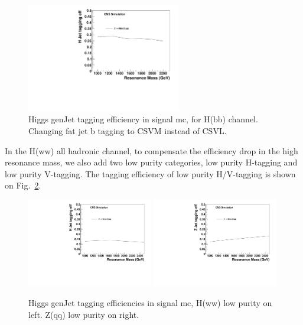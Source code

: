 \begin{figure}[htb]
\begin{center}
\includegraphics[width=0.60\textwidth]{HbbZqqfigs/Signal/H-taggingEff-8TeV-CSVM.pdf}
\end{center}
\caption{
Higgs genJet tagging efficiency in signal mc, for H(bb) channel.  Changing fat jet b tagging to CSVM instead of CSVL. 
}
\label{fig:fatCSVM}
\end{figure}


In the H(ww) all hadronic channel, to compensate the efficiency drop in the high resonance mass, we also add two low purity 
categories, low purity H-tagging and low purity V-tagging. 
The tagging efficiency of low purity H/V-tagging is shown on Fig.~\ref{fig:LowPurity}.  

\begin{figure}[htb]
\begin{center}
\includegraphics[width=0.49\textwidth]{HqqqqZqqfigs/Signal/H-taggingEff-8TeV-LowP.pdf}
\includegraphics[width=0.49\textwidth]{HqqqqZqqfigs/Signal/Z-taggingEff-8TeV-LowP.pdf}
\end{center}
\caption{
Higgs genJet tagging efficiencies in signal mc, H(ww) low purity on left. Z(qq) low purity on right.  
}
\label{fig:LowPurity}
\end{figure}

